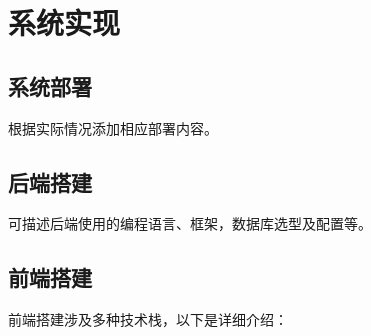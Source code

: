 \documentclass{cumcmthesis}
\numberwithin{equation}{section} %
\numberwithin{figure}{section} %
\numberwithin{table}{section} %
\begin{document}
\newpage

\section{系统实现}

\subsection{系统部署}

根据实际情况添加相应部署内容。

\subsection{后端搭建}
可描述后端使用的编程语言、框架，数据库选型及配置等。

\subsection{前端搭建}
前端搭建涉及多种技术栈，以下是详细介绍：
\end{document}

